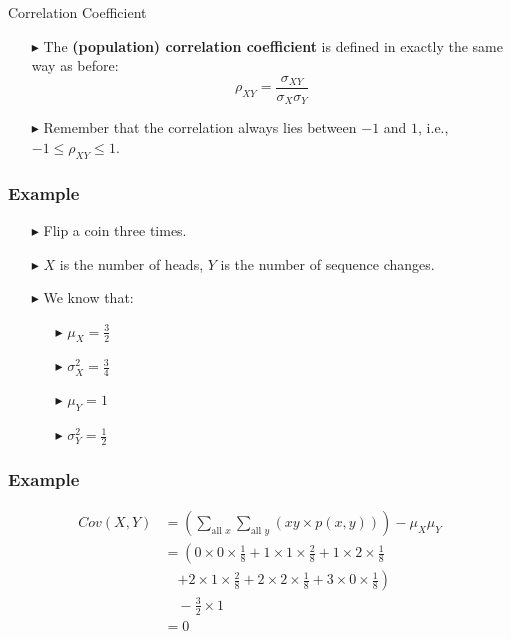 \documentclass[12pt]{beamer}
\begin{document}
\begin{frame}{Correlation Coefficient}
	\begin{itemize}
		\item[\color{blue}$\blacktriangleright$]The \textbf{(population) correlation coefficient} is defined in exactly the same way as before:
		\[
		\rho_{XY} = \frac{\sigma_{XY}}{\sigma_X \sigma_Y}
		\]
		\item[\color{blue}$\blacktriangleright$]Remember that the correlation always lies between $-1$ and $1$, i.e., $-1 \leq \rho_{XY} \leq 1$.
	\end{itemize}
\end{frame}
\begin{frame}
	\frametitle{Example}
\begin{itemize}
	\item[\color{blue}$\blacktriangleright$]Flip a coin three times.
	\item[\color{blue}$\blacktriangleright$]$X$ is the number of heads, $Y$ is the number of sequence changes.
	\item[\color{blue}$\blacktriangleright$]We know that:
	\begin{itemize}
		\item[\color{blue}$\blacktriangleright$]$\mu_X=\frac{3}{2}$
		\item[\color{blue}$\blacktriangleright$]$\sigma^2_X=\frac{3}{4}$
		\item[\color{blue}$\blacktriangleright$]$\mu_Y=1$
		\item[\color{blue}$\blacktriangleright$]$\sigma^2_Y=\frac{1}{2}$
	\end{itemize}
\end{itemize}
\end{frame}
\begin{frame}
	\frametitle{Example}
	\[
	\begin{aligned}
		Cov(X,Y) &= \left(\sum_{\text{all }x}\sum_{\text{all }y} (xy \times p(x,y))\right) - \mu_X\mu_Y \\[1em]
		&= \left(0 \times 0 \times \frac{1}{8} + 1 \times 1 \times \frac{2}{8} + 1 \times 2 \times \frac{1}{8} \right. \\
		&\quad \left. + 2 \times 1 \times \frac{2}{8} + 2 \times 2 \times \frac{1}{8} + 3 \times 0 \times \frac{1}{8}\right) \\[1em]
		&\quad - \frac{3}{2} \times 1 \\[1em]
		&= 0
	\end{aligned}
	\]
\end{frame}
\end{document}

